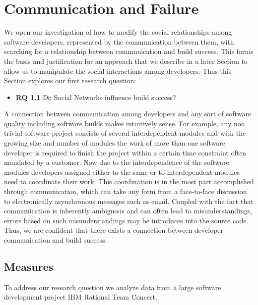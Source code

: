 \section{Communication and Failure}
\label{chap:soc-net}
We open our investigation of how to modify the social relationships among software developers, represented by the communication between them, with searching for a relationship between communication and build success.
This forms the basis and justification for an approach that we describe in a later Section to allow us to manipulate the social interactions among developers.
Thus this Section explores our first research question:
\begin{itemize}
\item\textbf{RQ 1.1} Do Social Networks influence build success?
\end{itemize}

A connection between communication among developers and any sort of software quality including software builds makes intuitively sense.
For example, any non trivial software project consists of several interdependent modules and with the growing size and number of modules the work of more than one software developer is required to finish the project within a certain time constraint often mandated by a customer.
Now due to the interdependence of the software modules developers assigned either to the same or to interdependent modules need to coordinate their work.
This coordination is in the most part accomplished through communication, which can take any form from a face-to-face discussion to electronically asynchronous messages such as email.
Coupled with the fact that communication is inherently ambiguous and can often lead to misunderstandings, errors based on such misunderstandings may be introduces into the source code.
Thus, we are confident that there exists  a connection between developer communication and build success.



\subsection{Measures}
\label{sec:Methodology}
To address our research question we analyze data from a large software
development project IBM Rational Team Concert.

